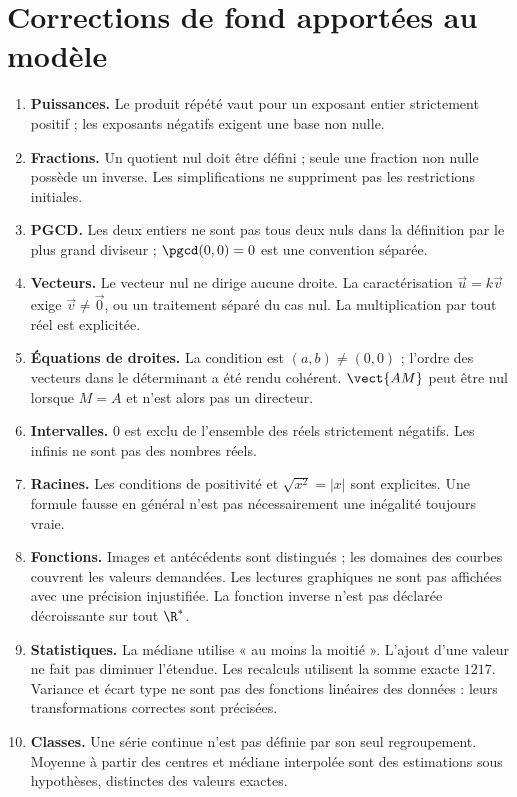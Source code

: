 \section*{Corrections de fond apportées au modèle}
\begin{enumerate}
\item \textbf{Puissances.} Le produit répété vaut pour un exposant entier strictement positif ; les exposants négatifs exigent une base non nulle.
\item \textbf{Fractions.} Un quotient nul doit être défini ; seule une fraction non nulle possède un inverse. Les simplifications ne suppriment pas les restrictions initiales.
\item \textbf{PGCD.} Les deux entiers ne sont pas tous deux nuls dans la définition par le plus grand diviseur ; $\pgcd(0,0)=0$ est une convention séparée.
\item \textbf{Vecteurs.} Le vecteur nul ne dirige aucune droite. La caractérisation $\vec u=k\vec v$ exige $\vec v\ne\vec0$, ou un traitement séparé du cas nul. La multiplication par tout réel est explicitée.
\item \textbf{Équations de droites.} La condition est $(a,b)\ne(0,0)$ ; l'ordre des vecteurs dans le déterminant a été rendu cohérent. $\vect{AM}$ peut être nul lorsque $M=A$ et n'est alors pas un directeur.
\item \textbf{Intervalles.} $0$ est exclu de l'ensemble des réels strictement négatifs. Les infinis ne sont pas des nombres réels.
\item \textbf{Racines.} Les conditions de positivité et $\sqrt{x^2}=|x|$ sont explicites. Une formule fausse en général n'est pas nécessairement une inégalité toujours vraie.
\item \textbf{Fonctions.} Images et antécédents sont distingués ; les domaines des courbes couvrent les valeurs demandées. Les lectures graphiques ne sont pas affichées avec une précision injustifiée. La fonction inverse n'est pas déclarée décroissante sur tout $\R^*$.
\item \textbf{Statistiques.} La médiane utilise « au moins la moitié ». L'ajout d'une valeur ne fait pas diminuer l'étendue. Les recalculs utilisent la somme exacte $1217$. Variance et écart type ne sont pas des fonctions linéaires des données : leurs transformations correctes sont précisées.
\item \textbf{Classes.} Une série continue n'est pas définie par son seul regroupement. Moyenne à partir des centres et médiane interpolée sont des estimations sous hypothèses, distinctes des valeurs exactes.

\end{enumerate}
